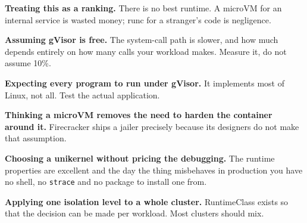 \begin{pitfall}
\begin{tight}
  \item \textbf{Treating this as a ranking.} There is no best runtime. A
        microVM for an internal service is wasted money; runc for a stranger's
        code is negligence.
  \item \textbf{Assuming gVisor is free.} The system-call path is slower, and
        how much depends entirely on how many calls your workload makes.
        Measure it, do not assume 10\%.
  \item \textbf{Expecting every program to run under gVisor.} It implements
        most of Linux, not all. Test the actual application.
  \item \textbf{Thinking a microVM removes the need to harden the container
        around it.} Firecracker ships a jailer precisely because its designers
        do not make that assumption.
  \item \textbf{Choosing a unikernel without pricing the debugging.} The
        runtime properties are excellent and the day the thing misbehaves in
        production you have no shell, no \texttt{strace} and no package to
        install one from.
  \item \textbf{Applying one isolation level to a whole cluster.} RuntimeClass
        exists so that the decision can be made per workload. Most clusters
        should mix.
\end{tight}
\end{pitfall}

